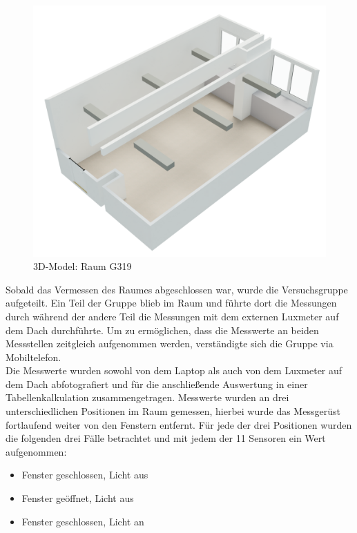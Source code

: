 \begin{figure}[H]
\begin{minipage}[b]{0.49\textwidth}
            \includegraphics[scale=0.25]{Abbildungen/3D-Model.png}
            \caption{3D-Model: Raum G319}
            \label{fig:3D-Model}    
        \end{minipage}
\end{figure}

Sobald das Vermessen des Raumes abgeschlossen war, wurde die Versuchsgruppe
aufgeteilt. Ein Teil der Gruppe blieb im Raum und führte dort die Messungen durch
während der andere Teil die Messungen mit dem externen Luxmeter auf dem Dach durchführte. 
Um zu ermöglichen, dass die Messwerte an beiden Messstellen zeitgleich aufgenommen werden,
verständigte sich die Gruppe via Mobiltelefon.\\
Die Messwerte wurden sowohl von dem Laptop als auch von dem Luxmeter auf dem Dach
abfotografiert und für die anschließende Auswertung in einer Tabellenkalkulation zusammengetragen. 
Messwerte wurden an drei unterschiedlichen Positionen im Raum gemessen, hierbei wurde
das Messgerüst fortlaufend weiter von den Fenstern entfernt.
Für jede der drei Positionen wurden die folgenden drei Fälle betrachtet und mit jedem der 11 Sensoren ein Wert aufgenommen: 
\small
\begin{multicols}{3}
    \begin{itemize}
        \item Fenster geschlossen, Licht aus
        \item Fenster geöffnet, Licht aus
        \item Fenster geschlossen, Licht an
    \end{itemize}
\end{multicols}


